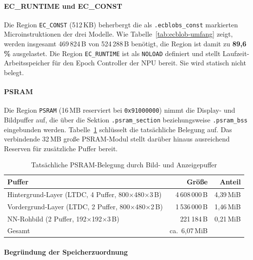 \paragraph{EC\_RUNTIME und EC\_CONST}

Die Region \texttt{EC\_CONST} (512\,KB) beherbergt die als \linebreak
\texttt{.ecblobs\_const} markierten Microinstruktionen der drei Modelle.
Wie Tabelle~\ref{tab:ecblob-umfang} zeigt, werden insgesamt 469\,824\,B
von 524\,288\,B benötigt, die Region ist damit zu \textbf{89{,}6\,\%}
ausgelastet. Die Region \texttt{EC\_RUNTIME} ist als \texttt{NOLOAD}
definiert und stellt Laufzeit-Arbeitsspeicher für den Epoch Controller der
NPU bereit. Sie wird statisch nicht belegt.

\paragraph{PSRAM}

Die Region \texttt{PSRAM} (16\,MB reserviert bei \texttt{0x91000000}) nimmt
die Display- und Bildpuffer auf, die über die Sektion
\texttt{.psram\_section} beziehungsweise \texttt{.psram\_bss} eingebunden
werden. Tabelle~\ref{tab:psram-belegung} schlüsselt die tatsächliche
Belegung auf. Das verbindende 32\,MB große PSRAM-Modul stellt darüber
hinaus ausreichend Reserven für zusätzliche Puffer bereit.

\begin{table}[H]
  \centering
  \label{tab:psram-belegung}
  \begin{tabular}{lr r}
    \toprule
    Puffer & Größe & Anteil \\
    \midrule
    Hintergrund-Layer (LTDC, 4 Puffer, 800$\times$480$\times$3\,B) & 4\,608\,000\,B & 4{,}39\,MiB \\
    Vordergrund-Layer (LTDC, 2 Puffer, 800$\times$480$\times$2\,B) & 1\,536\,000\,B & 1{,}46\,MiB \\
    NN-Rohbild (2 Puffer, 192$\times$192$\times$3\,B)              &   221\,184\,B & 0{,}21\,MiB \\
    \midrule
    Gesamt                                                                        & ca.\ 6{,}07\,MiB \\
    \bottomrule
  \end{tabular}
  \caption{Tatsächliche PSRAM-Belegung durch Bild- und Anzeigepuffer}
\end{table}

\paragraph{Begründung der Speicherzuordnung}

